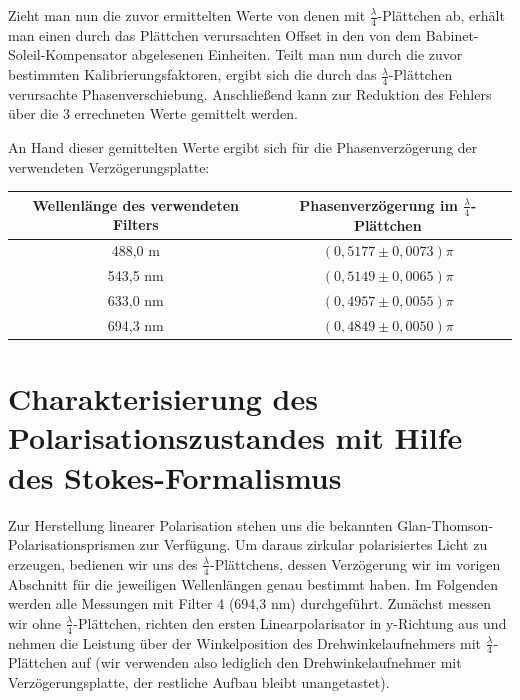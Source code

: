 \documentclass[bigchapter,colorback,accentcolor=tud4b,linedtoc,11pt]{tudreport}
\begin{document}
Zieht man nun die zuvor ermittelten Werte von denen mit $\frac{\lambda}{4}$-Plättchen ab, erhält man einen durch das Plättchen verursachten Offset in den von dem Babinet-Soleil-Kompensator abgelesenen Einheiten. Teilt man nun durch die zuvor bestimmten Kalibrierungsfaktoren, ergibt sich die durch das $\frac{\lambda}{4}$-Plättchen verursachte Phasenverschiebung. Anschließend kann zur Reduktion des Fehlers über die 3 errechneten Werte gemittelt werden.

An Hand dieser gemittelten Werte ergibt sich für die Phasenverzögerung der verwendeten Verzögerungsplatte:

\begin{center}
  \begin{tabular}{|c|c|}
    \hline
        Wellenlänge des verwendeten Filters & Phasenverzögerung im $\frac{\lambda}{4}$-Plättchen \\ \hline
        488,0 m                              & $(0,5177 \pm 0,0073)\pi$                           \\ \hline
        543,5 nm                              & $(0,5149 \pm 0,0065)\pi$                           \\ \hline
        633,0 nm                              & $(0,4957 \pm 0,0055)\pi$                           \\ \hline
        694,3 nm                              & $(0,4849 \pm 0,0050)\pi$                           \\ \hline
  \end{tabular}
\end{center}
\FloatBarrier


\section{Charakterisierung des Polarisationszustandes mit Hilfe des Stokes-Formalismus}
Zur Herstellung linearer Polarisation stehen uns die bekannten Glan-Thomson-Polarisationsprismen zur Verfügung. Um daraus zirkular polarisiertes Licht zu erzeugen, bedienen wir uns des $\frac{\lambda}{4}$-Plättchens, dessen Verzögerung wir im vorigen Abschnitt für die jeweiligen Wellenlängen genau bestimmt haben. Im Folgenden werden alle Messungen mit Filter 4 (694,3 nm) durchgeführt. Zunächst messen wir ohne $\frac{\lambda}{4}$-Plättchen, richten den ersten Linearpolarisator in y-Richtung aus und nehmen die Leistung über der Winkelposition des Drehwinkelaufnehmers mit $\frac{\lambda}{4}$-Plättchen auf (wir verwenden also lediglich den Drehwinkelaufnehmer mit Verzögerungsplatte, der restliche Aufbau bleibt unangetastet).
\end{document}
